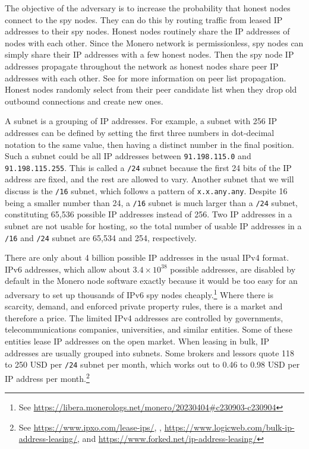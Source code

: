 \documentclass[english]{mrl}
\theoremstyle{plain}
\begin{document}
The objective of the adversary is to increase the probability that
honest nodes connect to the spy nodes. They can do this by routing
traffic from leased IP addresses to their spy nodes. Honest nodes
routinely share the IP addresses of nodes with each other. Since the
Monero network is permissionless, spy nodes can simply share their
IP addresses with a few honest nodes. Then the spy node IP addresses
propagate throughout the network as honest nodes share peer IP addresses
with each other. See \cite{Cao2020} for more information on peer
list propagation. Honest nodes randomly select from their peer candidate
list when they drop old outbound connections and create new ones.

A subnet is a grouping of IP addresses. For example, a subnet with
256 IP addresses can be defined by setting the first three numbers
in dot-decimal notation to the same value, then having a distinct
number in the final position. Such a subnet could be all IP addresses
between \texttt{91.198.115.0} and \texttt{91.198.115.255}. This is
called a \texttt{/24} subnet because the first 24 bits of the IP address
are fixed, and the rest are allowed to vary. Another subnet that we
will discuss is the \texttt{/16} subnet, which follows a pattern of
\texttt{x.x.any.any}. Despite 16 being a smaller number than 24, a
\texttt{/16} subnet is much larger than a \texttt{/24} subnet, constituting
65,536 possible IP addresses instead of 256. Two IP addresses in a
subnet are not usable for hosting, so the total number of usable IP
addresses in a \texttt{/16} and \texttt{/24} subnet are 65,534 and
254, respectively.

There are only about 4 billion possible IP addresses in the usual
IPv4 format. IPv6 addresses, which allow about $3.4\times10^{38}$
possible addresses, are disabled by default in the Monero node software
exactly because it would be too easy for an adversary to set up thousands
of IPv6 spy nodes cheaply.\footnote{See \href{https://libera.monerologs.net/monero/20230404\#c230903-c230904}{https://libera.monerologs.net/monero/20230404\#c230903-c230904}}
Where there is scarcity, demand, and enforced private property rules,
there is a market and therefore a price. The limited IPv4 addresses
are controlled by governments, telecommunications companies, universities,
and similar entities. Some of these entities lease IP addresses on
the open market. When leasing in bulk, IP addresses are usually grouped
into subnets. Some brokers and lessors quote 118 to 250 USD per \texttt{/24}
subnet per month, which works out to 0.46 to 0.98 USD per IP address
per month.\footnote{See \href{https://www.ipxo.com/lease-ips/}{https://www.ipxo.com/lease-ips/},
, \href{https://www.logicweb.com/bulk-ip-address-leasing/}{https://www.logicweb.com/bulk-ip-address-leasing/},
and \href{https://www.forked.net/ip-address-leasing/}{https://www.forked.net/ip-address-leasing/}}
\end{document}
